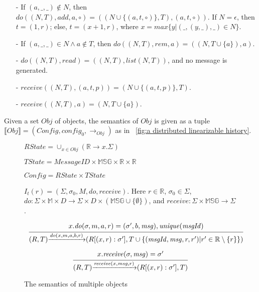 \begin{example}[RGA]
\begin{itemize}
\item[-] If $(a,\_,\_) \notin N$, then $\mathit{do}((N,T),\mathit{add},a,\circ) = ((N \cup \{ (a,t,\circ) \},T),(a,t,\circ))$. If $N = \epsilon$, then $t = (1,r)$; else, $t = (x+1,r)$, where $x = \mathit{max}\{ y \vert (\_,(y,\_),\_) \in N \}$.

\item[-] If $(a,\_,\_) \in N \wedge a \notin T$, then $\mathit{do}((N,T),\mathit{rem},a) = ((N,T \cup \{ a \} ),a)$.

\item[-] $\mathit{do}((N,T),\mathit{read}) = ((N,T),\mathit{list}(N,T))$, and no message is generated.

\item[-] $\mathit{receive}((N,T),(a,t,p)) = (N \cup \{ (a,t,p) \},T)$.

\item[-] $\mathit{receive}((N,T),a) = (N,T \cup \{ a \})$.
\end{itemize}
\end{example} 

 Given a set $\mathit{Obj}$ of objects, the semantics of $\mathit{Obj}$ is given as a tuple $\llbracket \mathit{Obj} \rrbracket = (\mathit{Config},\mathit{config}_0,\rightarrow_{\mathit{Obj}})$ as in \figurename~\ref{fig:a distributed linearizable history}. 
 
\begin{figure}[ht]
$\mathit{RState} = \cup_{x \in \mathit{Obj}} (\mathbb{R} \rightarrow x.\Sigma)$ 

$\mathit{TState} = \mathit{MessageID} \times \mathbb{MSG} \times \mathbb{R} \times \mathbb{R}$ 

$\mathit{Config} = \mathit{RState} \times \mathit{TState}$ 

$I_t(r) = (\Sigma, \sigma_0, M, \mathit{do},\mathit{receive})$. Here $r \in \mathbb{R}$, $\sigma_0 \in \Sigma$, $\mathit{do}:\Sigma \times \mathbb{M} \times D \rightarrow \Sigma \times D \times (\mathbb{MSG} \cup \{ \emptyset \} )$, and $\mathit{receive}: \Sigma \times \mathbb{MSG} \rightarrow \Sigma$.

\[
\begin{array}{l c}
\bigfrac{ x.\mathit{do}(\sigma,m,a,r) = (\sigma',b,\mathit{msg}), \mathit{unique}(\mathit{msgId}) }
{ (R,T) {\xrightarrow{\mathit{do}(x,m,a,b,r)}} (R[(x,r):\sigma'],T \cup \{ (\mathit{msgId},\mathit{msg},r,r') \vert r' \in \mathbb{R} \setminus \{ r \} \}) } 
\end{array}
\]

\[
\begin{array}{l c}
\bigfrac{ x.\mathit{receive}(\sigma,\mathit{msg}) = \sigma'}
{ (R,T) {\xrightarrow{\mathit{receive}(x,\mathit{msg},r)}} (R[(x,r):\sigma'],T) } 
\end{array}
\] 
\caption{The semantics of multiple objects} 
\label{fig:the semantics of multiple objects}
\end{figure}

